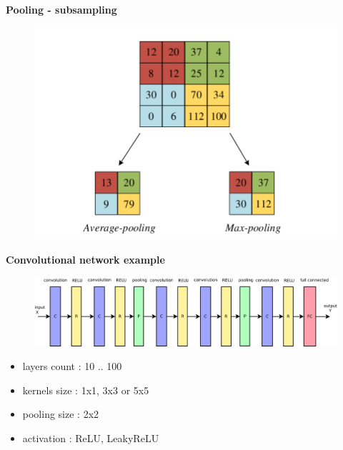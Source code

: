 \documentclass[xcolor=dvipsnames]{beamer}
\begin{document}
\begin{frame}{\bf Pooling - subsampling}

\begin{figure}
  \includegraphics[scale=0.2]{../../diagrams/pooling.png}
\end{figure}

\end{frame}


\begin{frame}{\bf Convolutional network example}

\begin{figure}
  \includegraphics[scale=0.25]{../../diagrams/nn/cnn.png}
\end{figure}

\begin{itemize}
    \item layers count : 10 .. 100
    \item kernels size : 1x1, 3x3 or 5x5
    \item pooling size : 2x2
    \item activation   : ReLU, LeakyReLU
\end{itemize}

\end{frame}
\end{document}
